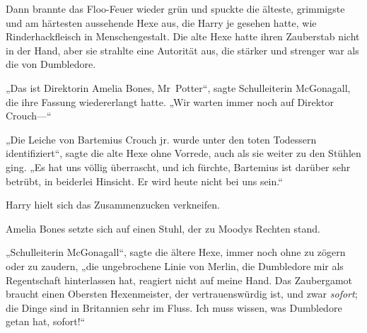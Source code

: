 Dann brannte das Floo-Feuer wieder grün und spuckte die älteste, grimmigste und am härtesten aussehende Hexe aus, die Harry je gesehen hatte, wie Rinderhackfleisch in Menschengestalt. Die alte Hexe hatte ihren Zauberstab nicht in der Hand, aber sie strahlte eine Autorität aus, die stärker und strenger war als die von Dumbledore.

„Das ist Direktorin Amelia Bones, Mr~Potter“, sagte Schulleiterin McGonagall, die ihre Fassung wiedererlangt hatte. „Wir warten immer noch auf Direktor Crouch—“

„Die Leiche von Bartemius Crouch jr. wurde unter den toten Todessern identifiziert“, sagte die alte Hexe ohne Vorrede, auch als sie weiter zu den Stühlen ging.
„Es hat uns völlig überrascht, und ich fürchte, Bartemius ist darüber sehr betrübt, in beiderlei Hinsicht. Er wird heute nicht bei uns sein.“

Harry hielt sich das Zusammenzucken verkneifen.

Amelia Bones setzte sich auf einen Stuhl, der zu Moodys Rechten stand.

„Schulleiterin McGonagall“, sagte die ältere Hexe, immer noch ohne zu zögern oder zu zaudern, „die ungebrochene Linie von Merlin, die Dumbledore mir als Regentschaft hinterlassen hat, reagiert nicht auf meine Hand. Das Zaubergamot braucht einen Obersten Hexenmeister, der vertrauenswürdig ist, und zwar \emph{sofort}; die Dinge sind in Britannien sehr im Fluss. Ich muss wissen, was Dumbledore getan hat, sofort!“

